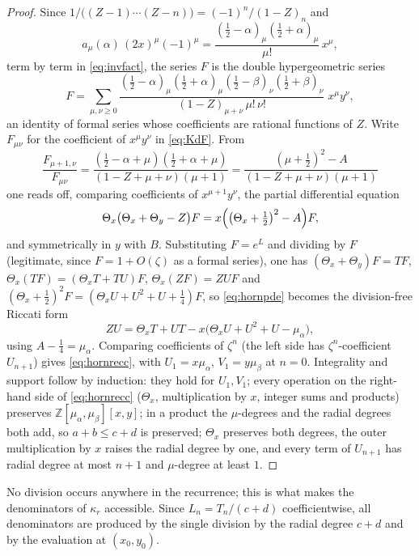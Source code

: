 \documentclass[12pt]{amsart}
\theoremstyle{definition}
\theoremstyle{remark}
\newcommand{\ma}{\mu_\alpha}
\newcommand{\mb}{\mu_\beta}
\begin{document}
\begin{proof}
Since $1/\bigl((Z-1)\cdots(Z-n)\bigr)=(-1)^n/(1-Z)_n$ and
\[
  a_\mu(\alpha)\,(2x)^\mu(-1)^\mu
  =\frac{(\tfrac12-\alpha)_\mu(\tfrac12+\alpha)_\mu}{\mu!}\,x^\mu ,
\]
term by term in \eqref{eq:invfact}, the series $F$ is the double hypergeometric series
\begin{equation}\label{eq:KdF}
  F=\sum_{\mu,\nu\ge0}
  \frac{(\tfrac12-\alpha)_\mu(\tfrac12+\alpha)_\mu
        (\tfrac12-\beta)_\nu(\tfrac12+\beta)_\nu}
       {(1-Z)_{\mu+\nu}\,\mu!\,\nu!}\;x^\mu y^\nu ,
\end{equation}
an identity of formal series whose coefficients are rational functions of $Z$.  Write $F_{\mu\nu}$ for the coefficient of $x^\mu y^\nu$ in
\eqref{eq:KdF}.  From
\[
  \frac{F_{\mu+1,\nu}}{F_{\mu\nu}}
  =\frac{(\tfrac12-\alpha+\mu)(\tfrac12+\alpha+\mu)}
        {(1-Z+\mu+\nu)(\mu+1)}
  =\frac{(\mu+\tfrac12)^2-A}{(1-Z+\mu+\nu)(\mu+1)}
\]
one reads off, comparing coefficients of $x^{\mu+1}y^\nu$, the partial differential equation
\begin{equation}\label{eq:hornpde}
  \Theta_x\bigl(\Theta_x+\Theta_y-Z\bigr)F
  =x\Bigl(\bigl(\Theta_x+\tfrac12\bigr)^2-A\Bigr)F ,
\end{equation}
and symmetrically in $y$ with $B$.  Substituting $F=e^L$ and dividing by $F$ (legitimate, since $F=1+O(\zeta)$ as a formal series), one has $(\Theta_x+\Theta_y)F=TF$, $\Theta_x(TF)=(\Theta_xT+TU)F$, $\Theta_x(ZF)=ZUF$ and $(\Theta_x+\tfrac12)^2F=(\Theta_xU+U^2+U+\tfrac14)F$, so \eqref{eq:hornpde} becomes the division-free Riccati form \begin{equation}\label{eq:riccati}
  ZU=\Theta_xT+UT-x\bigl(\Theta_xU+U^2+U-\ma\bigr),
\end{equation}
using $A-\tfrac14=\ma$.  Comparing coefficients of $\zeta^n$ (the left side has $\zeta^n$-coefficient $U_{n+1}$) gives \eqref{eq:hornrecc}, with $U_1=x\ma$, $V_1=y\mb$ at $n=0$.  Integrality and support follow by induction: they hold for $U_1,V_1$; every operation on the right-hand side of \eqref{eq:hornrecc}  ($\Theta_x$, multiplication by $x$, integer sums and products) preserves $\mathbb Z[\ma,\mb][x,y]$; in a product the $\mu$-degrees and the radial degrees both add, so $a+b\le c+d$ is preserved; $\Theta_x$ preserves both degrees, the outer multiplication by $x$ raises the radial degree by one, and every term of $U_{n+1}$ has radial degree at most $n+1$ and $\mu$-degree at least $1$.
\end{proof}

No division occurs anywhere in the recurrence; this is what makes the denominators of $\kappa_r$ accessible.  Since $L_n=T_n/(c+d)$ coefficientwise, all denominators are produced by the single division by the radial degree $c+d$ and by the evaluation at $(x_0,y_0)$.
\end{document}
